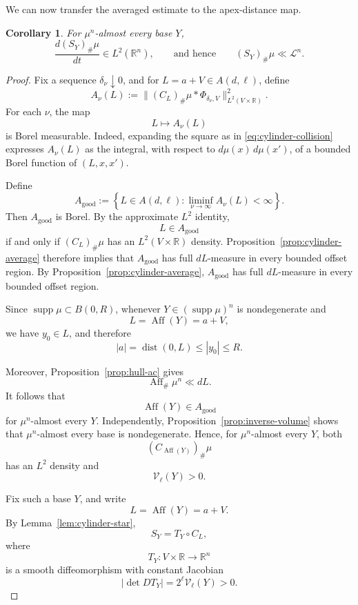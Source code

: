 \documentclass[11pt]{article}
\newtheorem{corollary}[theorem]{Corollary}
\theoremstyle{remark}
\newcommand{\R}{\mathbb R}
\newcommand{\cL}{\mathcal L}
\newcommand{\supp}{\operatorname{supp}}
\newcommand{\dist}{\operatorname{dist}}
\numberwithin{equation}{section}
\newcommand{\1}{\mathbf 1}
\DeclareMathOperator{\Aff}{Aff}
\begin{document}
We can now transfer the averaged estimate to the apex-distance map.




\begin{corollary}
\label{cor:good-bases}
For $\mu^n$-almost every base $Y$,
\begin{equation}
\frac{d(S_Y)_\#\mu}{dt}\in L^2(\R^n),
\qquad\text{and hence}\qquad
(S_Y)_\#\mu\ll\cL^n.
\label{eq:apex-ac}
\end{equation}
\end{corollary}

\begin{proof}
Fix a sequence \(\delta_\nu\downarrow0\), and for
\(L=a+V\in A(d,\ell)\), define
\[
A_\nu(L)
:=
\bigl\|
(C_L)_\#\mu*\Phi_{\delta_\nu,V}
\bigr\|_{L^2(V\times\mathbb R)}^2.
\]
For each \(\nu\), the map
\[
L\longmapsto A_\nu(L)
\]
is Borel measurable. Indeed, expanding the square as in
\eqref{eq:cylinder-collision} expresses \(A_\nu(L)\) as the integral,
with respect to \(d\mu(x)\,d\mu(x')\), of a bounded Borel function of
\((L,x,x')\).

Define
\[
A_{\mathrm{good}}
:=
\left\{
L\in A(d,\ell):
\liminf_{\nu\to\infty}A_\nu(L)<\infty
\right\}.
\]
Then \(A_{\mathrm{good}}\) is Borel. By the approximate
\(L^2\) identity,
\[
L\in A_{\mathrm{good}}
\]
if and only if \((C_L)_\#\mu\) has an
\(L^2(V\times\mathbb R)\) density. Proposition~\ref{prop:cylinder-average}
therefore implies that \(A_{\mathrm{good}}\) has full \(dL\)-measure
in every bounded offset region. By Proposition~\ref{prop:cylinder-average},
\(A_{\mathrm{good}}\) has full \(dL\)-measure in every bounded offset
region.

Since \(\supp\mu\subset B(0,R)\), whenever
\(Y\in(\supp\mu)^n\) is nondegenerate and
\[
L=\Aff(Y)=a+V,
\]
we have \(y_0\in L\), and therefore
\[
|a|=\dist(0,L)\leq |y_0|\leq R.
\]



Moreover, Proposition~\ref{prop:hull-ac} gives
\[
\Aff_\#\mu^n\ll dL.
\]
It follows that
\[
\Aff(Y)\in A_{\mathrm{good}}
\]
for \(\mu^n\)-almost every \(Y\). Independently,
Proposition~\ref{prop:inverse-volume} shows that
\(\mu^n\)-almost every base is nondegenerate. Hence, for
\(\mu^n\)-almost every \(Y\), both
\[
(C_{\Aff(Y)})_\#\mu
\]
has an \(L^2\) density and
\[
\mathcal V_\ell(Y)>0.
\]

Fix such a base \(Y\), and write
\[
L=\Aff(Y)=a+V.
\]
By Lemma~\ref{lem:cylinder-star},
\[
S_Y=T_Y\circ C_L,
\]
where
\[
T_Y:V\times\R\longrightarrow\R^n
\]
is a smooth diffeomorphism with constant Jacobian
\[
|\det DT_Y|=2^\ell\mathcal V_\ell(Y)>0.
\]


\end{proof}
\end{document}
